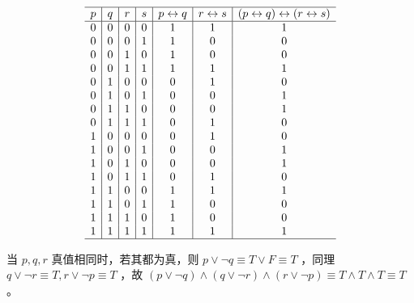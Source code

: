 {{        %
        \begin{practices}
            \begin{table}[H]
                \[
                    \begin{array}{c|c|c|c|c|c|c}
                        \hline
                        p & q & r & s & p \leftrightarrow q & r \leftrightarrow s & (p \leftrightarrow q) \leftrightarrow (r \leftrightarrow s) \\
                        \hline
                        0 & 0 & 0 & 0 & 1 & 1 & 1 \\
                        0 & 0 & 0 & 1 & 1 & 0 & 0 \\
                        0 & 0 & 1 & 0 & 1 & 0 & 0 \\
                        0 & 0 & 1 & 1 & 1 & 1 & 1 \\
                        0 & 1 & 0 & 0 & 0 & 1 & 0 \\
                        0 & 1 & 0 & 1 & 0 & 0 & 1 \\
                        0 & 1 & 1 & 0 & 0 & 0 & 1 \\
                        0 & 1 & 1 & 1 & 0 & 1 & 0 \\
                        1 & 0 & 0 & 0 & 0 & 1 & 0 \\
                        1 & 0 & 0 & 1 & 0 & 0 & 1 \\
                        1 & 0 & 1 & 0 & 0 & 0 & 1 \\
                        1 & 0 & 1 & 1 & 0 & 1 & 0 \\
                        1 & 1 & 0 & 0 & 1 & 1 & 1 \\
                        1 & 1 & 0 & 1 & 1 & 0 & 0 \\
                        1 & 1 & 1 & 0 & 1 & 0 & 0 \\
                        1 & 1 & 1 & 1 & 1 & 1 & 1 \\
                        \hline
                    \end{array}
                \]
            \end{table}
        \end{practices}

        \begin{practices}
            当 $p, q, r$ 真值相同时，若其都为真，则 $p \vee \neg q \equiv T \vee F \equiv T$ ，同理 $q \vee \neg r \equiv T, r \vee \neg p \equiv T$ ，故 $(p \vee \neg q) \wedge (q \vee \neg r) \wedge (r \vee \neg p) \equiv T \wedge T \wedge T \equiv T$ 。


\end{practices}}}
